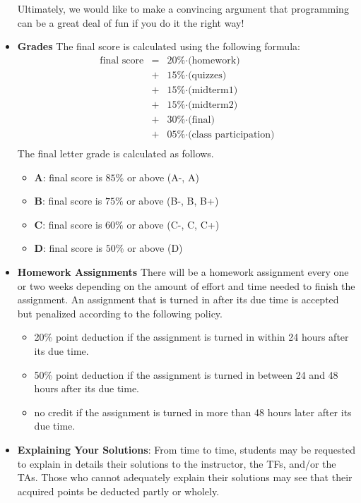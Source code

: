 \documentclass[11pt]{article}
\begin{document}
\begin{itemize}
Ultimately, we would like to make a convincing argument that programming
can be a great deal of fun if you do it the right way!

\item {\bf Grades}
The final score is calculated using the following formula:
\[\begin{array}{rcl}
\mbox{final score} & = & \mbox{20\%$\cdot$(homework)} \\
                   & + & \mbox{15\%$\cdot$(quizzes)} \\
                   & + & \mbox{15\%$\cdot$(midterm1)} \\
                   & + & \mbox{15\%$\cdot$(midterm2)} \\
                   & + & \mbox{30\%$\cdot$(final)} \\
                   & + & \mbox{05\%$\cdot$(class participation)} \\
\end{array}\]
The final letter grade is calculated as follows.
\begin{itemize}
\item{\bf A}: final score is $85\%$ or above (A-, A)
\item{\bf B}: final score is $75\%$ or above (B-, B, B+)
\item{\bf C}: final score is $60\%$ or above (C-, C, C+)
\item{\bf D}: final score is $50\%$ or above (D)
\end{itemize}

\item{\bf Homework Assignments}
There will be a homework assignment every one or two weeks depending on the
amount of effort and time needed to finish the assignment. An assignment that
is turned in after its due time is accepted but penalized according to the
following policy.
\begin{itemize}
\item 20\% point deduction if the assignment is turned in within 24 hours
after its due time.
\item 50\% point deduction if the assignment is turned in between 24 and 48 hours
after its due time.
\item no credit if the assignment is turned in more than 48 hours later after its due time.
\end{itemize}

\item{\bf Explaining Your Solutions}:
From time to time, students may be requested to explain in details
their solutions to the instructor, the TFs, and/or the TAs. Those who
cannot adequately explain their solutions may see that their acquired
points be deducted partly or wholely.


\end{itemize}
\end{document}

